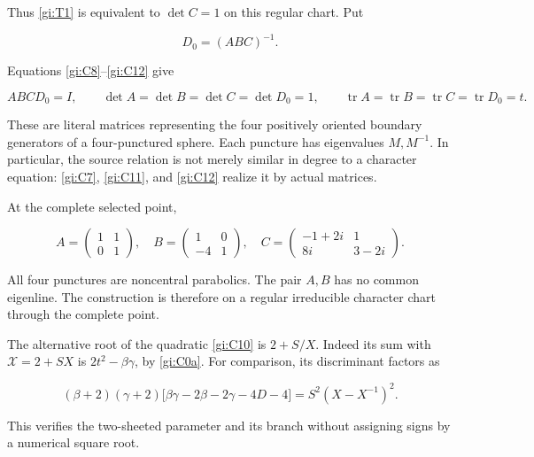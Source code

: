 Thus \eqref{gi:T1} is equivalent to \(\det C=1\) on this regular chart. Put

\begin{equation}\label{gi:C12}
D_0=(ABC)^{-1}.
\end{equation}

Equations \eqref{gi:C8}--\eqref{gi:C12} give

\begin{equation}\label{gi:C13}
ABCD_0=I,\qquad
 \det A=\det B=\det C=\det D_0=1,\qquad
 \operatorname{tr}A=\operatorname{tr}B
       =\operatorname{tr}C=\operatorname{tr}D_0=t.
\end{equation}

These are literal matrices representing the four positively oriented boundary generators of a four-punctured sphere. Each puncture has eigenvalues \(M,M^{-1}\). In particular, the source relation is not merely similar in degree to a character equation: \eqref{gi:C7}, \eqref{gi:C11}, and \eqref{gi:C12} realize it by actual matrices.

At the complete selected point,

\begin{equation}\label{gi:C14}
A=\begin{pmatrix}1&1\\0&1\end{pmatrix},\quad
 B=\begin{pmatrix}1&0\\-4&1\end{pmatrix},\quad
 C=\begin{pmatrix}-1+2i&1\\8i&3-2i\end{pmatrix}.
\end{equation}

All four punctures are noncentral parabolics. The pair \(A,B\) has no common eigenline. The construction is therefore on a regular irreducible character chart through the complete point.

The alternative root of the quadratic \eqref{gi:C10} is \(2+S/X\). Indeed its sum with \(\mathcal X=2+SX\) is \(2t^2-\beta\gamma\), by \eqref{gi:C0a}. For comparison, its discriminant factors as

\begin{equation}\label{gi:C15}
(\beta+2)(\gamma+2)
       \bigl[\beta\gamma-2\beta-2\gamma-4D-4\bigr]
           =S^2(X-X^{-1})^2.
\end{equation}

This verifies the two-sheeted parameter and its branch without assigning signs by a numerical square root.

